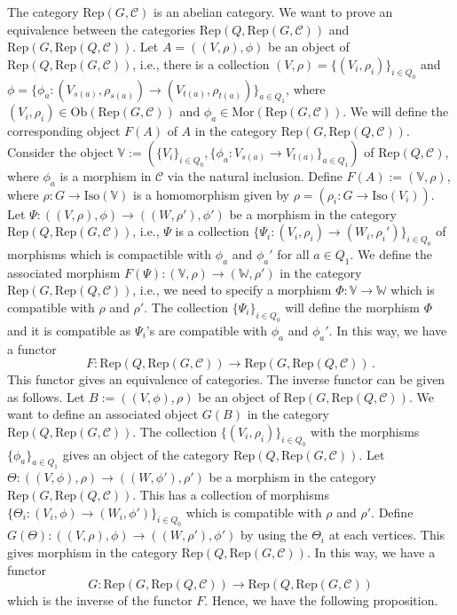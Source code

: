\documentclass[12pt, reqno]{amsart}
\theoremstyle{plain}
\numberwithin{equation}{section}
\begin{document}
The category $\mathrm{Rep}(G,\mathcal{C})$ is an abelian category. We want to prove an equivalence between the categories $\mathrm{Rep}(Q,\mathrm{Rep}(G,\mathcal{C}))$ and $\mathrm{Rep}(G,\mathrm{Rep}(Q,\mathcal{C}))$. Let $A=((V,\rho),\phi)$ be an object of $\mathrm{Rep}(Q,\mathrm{Rep}(G,\mathcal{C}))$, i.e., there is a collection $(V,\rho)=\{(V_i,\rho_i)\}_{i\in Q_0}$ and $\phi=\{\phi_a: (V_{s(a)},\rho_{s(a)})\rightarrow (V_{t(a)},\rho_{t(a)})\}_{a\in Q_1}$, where $(V_i,\rho_i)\in \mathrm{Ob}(\mathrm{Rep}(G,\mathcal{C}))$ and $\phi_a \in \mathrm{Mor}(\mathrm{Rep}(G,\mathcal{C}))$. We will define the corresponding object $F(A)$ of $A$ in the category $\mathrm{Rep}(G,\mathrm{Rep}(Q,\mathcal{C}))$. Consider the object $\mathbb{V}:=(\{V_i\}_{i\in Q_0},\{\phi_a:V_{s(a)}\rightarrow V_{t(a)}\}_{a\in Q_1})$ of $\mathrm{Rep}(Q,\mathcal{C})$, where $\phi_a$ is a morphism in $\mathcal{C}$ via the natural inclusion. Define $F(A):= (\mathbb{V},\rho)$, where $\rho: G\rightarrow \mathrm{Iso}(\mathbb{V})$ is a homomorphism given by $\rho=(\rho_i:G\rightarrow \mathrm{Iso}(V_i))$. Let $\Psi: ((V,\rho),\phi) \rightarrow ((W,\rho'),\phi')$ be a morphism in the category $\mathrm{Rep}(Q,\mathrm{Rep}(G,\mathcal{C}))$, i.e., $\Psi$ is a collection $\{ \Psi_{i}: (V_i,\rho_i)\rightarrow (W_i,\rho_i') \}_{i\in Q_0}$ of morphisms which is compactible with $\phi_a$ and $\phi_a'$ for all $a\in Q_1$. We define the associated morphism $F(\Psi): (\mathbb{V},\rho)\rightarrow (\mathbb{W},\rho')$ in the category $\mathrm{Rep}(G,\mathrm{Rep}(Q,\mathcal{C}))$, i.e., we need to specify a morphism $\Phi:\mathbb{V}\rightarrow \mathbb{W}$ which is compatible with $\rho$ and $\rho'$. The collection $\{\Psi_i \}_{i\in Q_0}$ will define the morphism $\Phi$ and it is compatible as $\Psi_i$'s are compatible with $\phi_a$ and $\phi_a'$. In this way, we have a functor 
$$F:\mathrm{Rep}(Q,\mathrm{Rep}(G,\mathcal{C}))\longrightarrow \mathrm{Rep}(G,\mathrm{Rep}(Q,\mathcal{C}))\,.$$
This functor gives an equivalence of categories. The inverse functor can be given as follows. Let $B:=((V,\phi),\rho)$ be an object of $\mathrm{Rep}(G, \mathrm{Rep}(Q,\mathcal{C}))$. We want to define an associated object $G(B)$ in the category $\mathrm{Rep}(Q,\mathrm{Rep}(G,\mathcal{C}))$. The collection $\{(V_i,\rho_i)\}_{i\in Q_0}$ with the morphisms $\{\phi_a\}_{a\in Q_1}$ gives an object of the category $\mathrm{Rep}(Q,\mathrm{Rep}(G,\mathcal{C}))$. Let $\Theta: ((V,\phi),\rho)\rightarrow ((W,\phi'),\rho')$ be a morphism in the category $\mathrm{Rep}(G,\mathrm{Rep}(Q,\mathcal{C}))$. This has a collection of morphisms $\{ \Theta_i: (V_i,\phi)\rightarrow (W_i,\phi')\}_{i\in Q_0}$ which is compatible with $\rho$ and $\rho'$. Define $G(\Theta): ((V,\rho),\phi)\rightarrow ((W,\rho'),\phi')$ by using the $\Theta_i$ at each vertices. This gives morphism in the category $\mathrm{Rep}(Q,\mathrm{Rep}(G,\mathcal{C}))$. In this way, we have a functor 
$$G:\mathrm{Rep}(G,\mathrm{Rep}(Q,\mathcal{C}))\longrightarrow \mathrm{Rep}(Q,\mathrm{Rep}(G,\mathcal{C}))$$
which is the inverse of the functor $F$. Hence, we have the following proposition. 
\end{document}
